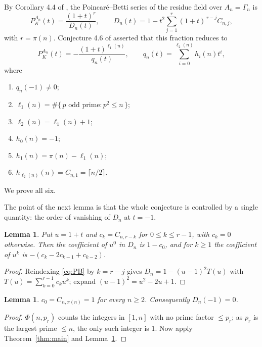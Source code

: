 \documentclass[a4paper,11pt,oneside,reqno]{amsart}
\theoremstyle{definition}
\theoremstyle{remark}
\theoremstyle{plain}
\newtheorem{lemma}[definition]{Lemma}
\newcommand{\Gam}{\Gamma}
\begin{document}
By Corollary 4.4 of \cite{Snellman2000}, the Poincaré--Betti series of the
residue field over \(A_n = \Gam_n\) is
\begin{equation}\label{eq:PB}
  P^{A_n}_K(t) = \frac{(1+t)^{r}}{D_n(t)},\qquad
  D_n(t) = 1-t^{2}\sum_{j = 1}^{r}(1+t)^{\,r-j}C_{n,j},
\end{equation}
with \(r = \pi(n)\). Conjecture 4.6 of \cite{Snellman2000} asserted that this
fraction reduces to
\begin{equation}\label{eq:conj}
  P^{A_n}_K(t) = -\frac{(1+t)^{\ell_1(n)}}{q_n(t)},\qquad
  q_n(t) = \sum_{i = 0}^{\ell_2(n)}h_i(n)t^{i},
\end{equation}
where
\begin{enumerate}
  \item \(q_n(-1) \ne 0\);
  \item \(\ell_1(n) = \#\{\,p \text{ odd prime} : p^{2} \le n\,\}\);
  \item \(\ell_2(n) = \ell_1(n)+1\);
  \item \(h_0(n) = -1\);
  \item \(h_1(n) = \pi(n)-\ell_1(n)\);
  \item \(h_{\ell_2(n)}(n) = C_{n,1} = \lceil n/2\rceil\).
\end{enumerate}
We prove all six.

The point of the next lemma is that the whole conjecture is controlled by a
single quantity: the order of vanishing of \(D_n\) at \(t = -1\).

\begin{lemma}\label{lem:secondiff}
  Put \(u = 1+t\) and \(c_k = C_{n,r-k}\) for \(0 \le k \le r-1\), with \(c_k = 0\)
  otherwise. Then the coefficient of \(u^{0}\) in \(D_n\) is \(1-c_0\), and for
  \(k \ge 1\) the coefficient of \(u^{k}\) is
  \(-\left(c_k-2c_{k-1}+c_{k-2}\right)\).
\end{lemma}

\begin{proof}
  Reindexing \eqref{eq:PB} by \(k = r-j\) gives
  \(D_n = 1-(u-1)^{2}T(u)\) with \(T(u) = \sum_{k = 0}^{r-1}c_ku^{k}\); expand
  \((u-1)^{2} = u^{2}-2u+1\).
\end{proof}

\begin{lemma}\label{lem:c0}
  \(c_0 = C_{n,\pi(n)} = 1\) for every \(n \ge 2\). Consequently \(D_n(-1) = 0\).
\end{lemma}

\begin{proof}
  \(\Phi(n,p_r)\) counts the integers in \([1,n]\) with no prime factor
  \(\le p_r\); as \(p_r\) is the largest prime \(\le n\), the only such integer
  is \(1\). Now apply Theorem~\ref{thm:main} and Lemma~\ref{lem:secondiff}.
\end{proof}
\end{document}

